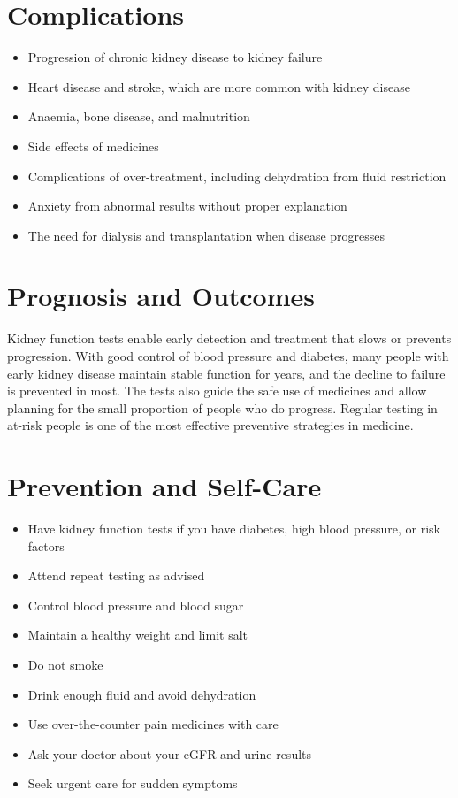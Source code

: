\section*{Complications}
\begin{itemize}
    \item Progression of chronic kidney disease to kidney failure
    \item Heart disease and stroke, which are more common with kidney disease
    \item Anaemia, bone disease, and malnutrition
    \item Side effects of medicines
    \item Complications of over-treatment, including dehydration from fluid restriction
    \item Anxiety from abnormal results without proper explanation
    \item The need for dialysis and transplantation when disease progresses
\end{itemize}

\section*{Prognosis and Outcomes}
Kidney function tests enable early detection and treatment that slows or prevents progression. With good control of blood pressure and diabetes, many people with early kidney disease maintain stable function for years, and the decline to failure is prevented in most. The tests also guide the safe use of medicines and allow planning for the small proportion of people who do progress. Regular testing in at-risk people is one of the most effective preventive strategies in medicine.

\section*{Prevention and Self-Care}
\begin{itemize}
    \item Have kidney function tests if you have diabetes, high blood pressure, or risk factors
    \item Attend repeat testing as advised
    \item Control blood pressure and blood sugar
    \item Maintain a healthy weight and limit salt
    \item Do not smoke
    \item Drink enough fluid and avoid dehydration
    \item Use over-the-counter pain medicines with care
    \item Ask your doctor about your eGFR and urine results
    \item Seek urgent care for sudden symptoms
\end{itemize}

